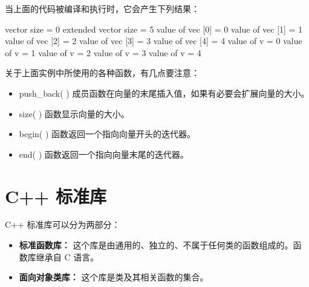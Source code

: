 \documentclass[
]{article}
\newenvironment{Shaded}{}{}
\newcommand{\DecValTok}[1]{\textcolor[rgb]{0.25,0.63,0.44}{#1}}
\newcommand{\NormalTok}[1]{#1}
\newcommand{\OperatorTok}[1]{\textcolor[rgb]{0.40,0.40,0.40}{#1}}
\providecommand{\tightlist}{%
  \setlength{\itemsep}{0pt}\setlength{\parskip}{0pt}}
\begin{document}
当上面的代码被编译和执行时，它会产生下列结果：

\begin{Shaded}
\begin{Highlighting}[]
\NormalTok{vector size }\OperatorTok{=} \DecValTok{0}
\NormalTok{extended vector size }\OperatorTok{=} \DecValTok{5}
\NormalTok{value of vec }\OperatorTok{[}\DecValTok{0}\OperatorTok{]} \OperatorTok{=} \DecValTok{0}
\NormalTok{value of vec }\OperatorTok{[}\DecValTok{1}\OperatorTok{]} \OperatorTok{=} \DecValTok{1}
\NormalTok{value of vec }\OperatorTok{[}\DecValTok{2}\OperatorTok{]} \OperatorTok{=} \DecValTok{2}
\NormalTok{value of vec }\OperatorTok{[}\DecValTok{3}\OperatorTok{]} \OperatorTok{=} \DecValTok{3}
\NormalTok{value of vec }\OperatorTok{[}\DecValTok{4}\OperatorTok{]} \OperatorTok{=} \DecValTok{4}
\NormalTok{value of v }\OperatorTok{=} \DecValTok{0}
\NormalTok{value of v }\OperatorTok{=} \DecValTok{1}
\NormalTok{value of v }\OperatorTok{=} \DecValTok{2}
\NormalTok{value of v }\OperatorTok{=} \DecValTok{3}
\NormalTok{value of v }\OperatorTok{=} \DecValTok{4}
\end{Highlighting}
\end{Shaded}

关于上面实例中所使用的各种函数，有几点要注意：

\begin{itemize}
\tightlist
\item
  push\_back( ) 成员函数在向量的末尾插入值，如果有必要会扩展向量的大小。
\item
  size( ) 函数显示向量的大小。
\item
  begin( ) 函数返回一个指向向量开头的迭代器。
\item
  end( ) 函数返回一个指向向量末尾的迭代器。
\end{itemize}

\hypertarget{c-ux6807ux51c6ux5e93}{%
\section{C++ 标准库}\label{c-ux6807ux51c6ux5e93}}

C++ 标准库可以分为两部分：

\begin{itemize}
\tightlist
\item
  \textbf{标准函数库：}
  这个库是由通用的、独立的、不属于任何类的函数组成的。函数库继承自 C
  语言。
\item
  \textbf{面向对象类库：} 这个库是类及其相关函数的集合。
\end{itemize}
\end{document}

